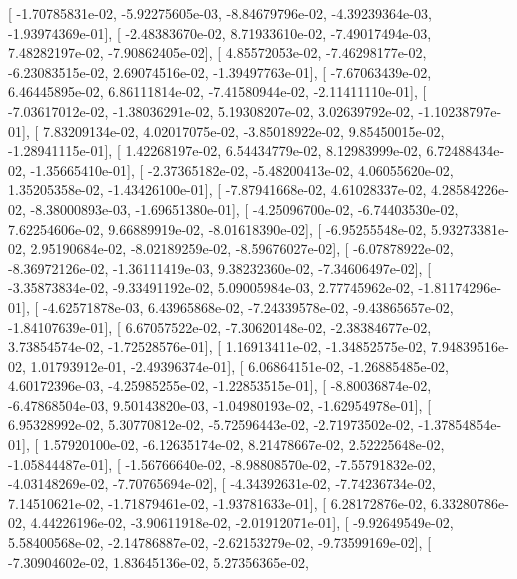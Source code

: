 \documentclass{article}
\begin{document}
       [ -1.70785831e-02,  -5.92275605e-03,  -8.84679796e-02,
         -4.39239364e-03,  -1.93974369e-01],
       [ -2.48383670e-02,   8.71933610e-02,  -7.49017494e-03,
          7.48282197e-02,  -7.90862405e-02],
       [  4.85572053e-02,  -7.46298177e-02,  -6.23083515e-02,
          2.69074516e-02,  -1.39497763e-01],
       [ -7.67063439e-02,   6.46445895e-02,   6.86111814e-02,
         -7.41580944e-02,  -2.11411110e-01],
       [ -7.03617012e-02,  -1.38036291e-02,   5.19308207e-02,
          3.02639792e-02,  -1.10238797e-01],
       [  7.83209134e-02,   4.02017075e-02,  -3.85018922e-02,
          9.85450015e-02,  -1.28941115e-01],
       [  1.42268197e-02,   6.54434779e-02,   8.12983999e-02,
          6.72488434e-02,  -1.35665410e-01],
       [ -2.37365182e-02,  -5.48200413e-02,   4.06055620e-02,
          1.35205358e-02,  -1.43426100e-01],
       [ -7.87941668e-02,   4.61028337e-02,   4.28584226e-02,
         -8.38000893e-03,  -1.69651380e-01],
       [ -4.25096700e-02,  -6.74403530e-02,   7.62254606e-02,
          9.66889919e-02,  -8.01618390e-02],
       [ -6.95255548e-02,   5.93273381e-02,   2.95190684e-02,
         -8.02189259e-02,  -8.59676027e-02],
       [ -6.07878922e-02,  -8.36972126e-02,  -1.36111419e-03,
          9.38232360e-02,  -7.34606497e-02],
       [ -3.35873834e-02,  -9.33491192e-02,   5.09005984e-03,
          2.77745962e-02,  -1.81174296e-01],
       [ -4.62571878e-03,   6.43965868e-02,  -7.24339578e-02,
         -9.43865657e-02,  -1.84107639e-01],
       [  6.67057522e-02,  -7.30620148e-02,  -2.38384677e-02,
          3.73854574e-02,  -1.72528576e-01],
       [  1.16913411e-02,  -1.34852575e-02,   7.94839516e-02,
          1.01793912e-01,  -2.49396374e-01],
       [  6.06864151e-02,  -1.26885485e-02,   4.60172396e-03,
         -4.25985255e-02,  -1.22853515e-01],
       [ -8.80036874e-02,  -6.47868504e-03,   9.50143820e-03,
         -1.04980193e-02,  -1.62954978e-01],
       [  6.95328992e-02,   5.30770812e-02,  -5.72596443e-02,
         -2.71973502e-02,  -1.37854854e-01],
       [  1.57920100e-02,  -6.12635174e-02,   8.21478667e-02,
          2.52225648e-02,  -1.05844487e-01],
       [ -1.56766640e-02,  -8.98808570e-02,  -7.55791832e-02,
         -4.03148269e-02,  -7.70765694e-02],
       [ -4.34392631e-02,  -7.74236734e-02,   7.14510621e-02,
         -1.71879461e-02,  -1.93781633e-01],
       [  6.28172876e-02,   6.33280786e-02,   4.44226196e-02,
         -3.90611918e-02,  -2.01912071e-01],
       [ -9.92649549e-02,   5.58400568e-02,  -2.14786887e-02,
         -2.62153279e-02,  -9.73599169e-02],
       [ -7.30904602e-02,   1.83645136e-02,   5.27356365e-02,
\end{document}
